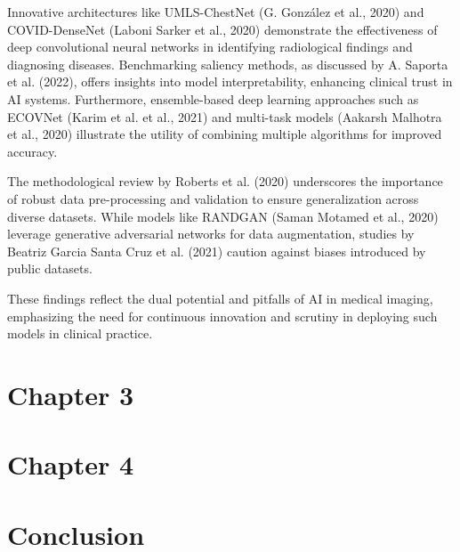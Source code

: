 \documentclass[12pt,a4paper]{report}
\begin{document}
Innovative architectures like UMLS-ChestNet (G. González et al., 2020)\cite{González_2020} and COVID-DenseNet (Laboni Sarker et al., 2020)\cite{Sarker_2020} demonstrate the effectiveness of deep convolutional neural networks in identifying radiological findings and diagnosing diseases. Benchmarking saliency methods, as discussed by A. Saporta et al. (2022)\cite{Saporta_2022}, offers insights into model interpretability, enhancing clinical trust in AI systems. Furthermore, ensemble-based deep learning approaches such as ECOVNet (Karim et al. et al., 2021)\cite{Karim2021ECOVNet} and multi-task models (Aakarsh Malhotra et al., 2020)\cite{Malhotra_2020} illustrate the utility of combining multiple algorithms for improved accuracy.

The methodological review by Roberts et al. (2020)\cite{Roberts_2020} underscores the importance of robust data pre-processing and validation to ensure generalization across diverse datasets. While models like RANDGAN (Saman Motamed et al., 2020)\cite{Motamed_2020} leverage generative adversarial networks for data augmentation, studies by Beatriz Garcia Santa Cruz et al. (2021)\cite{Cruz_2021} caution against biases introduced by public datasets.

These findings reflect the dual potential and pitfalls of AI in medical imaging, emphasizing the need for continuous innovation and scrutiny in deploying such models in clinical practice.

\chapter{Chapter 3}



\chapter{Chapter 4}

\chapter{Conclusion}

\raggedright
	
\end{document}
